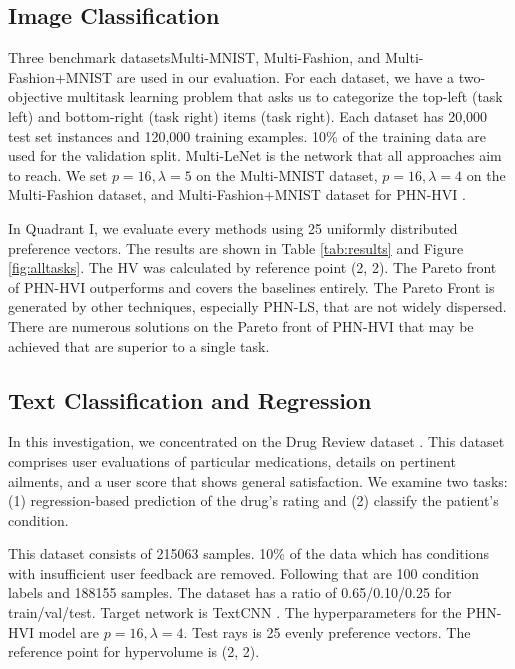 \documentclass[letterpaper]{article} %
\newcommand{\ourmodel}{PHN-HVI }
\begin{document}
\subsection{Image Classification}
Three benchmark datasetsMulti-MNIST, Multi-Fashion, and Multi-Fashion+MNIST \cite{lin2019pareto} are used in our evaluation. For each dataset, we have a two-objective multitask learning problem that asks us to categorize the top-left (task left) and bottom-right (task right) items (task right). Each dataset has 20,000 test set instances and 120,000 training examples. 10\% of the training data are used for the validation split. Multi-LeNet \cite{sener2019multitask} is the network that all approaches aim to reach. We set $p=16, \lambda=5$ on the Multi-MNIST dataset, $p=16, \lambda=4$ on the Multi-Fashion dataset, and Multi-Fashion+MNIST dataset for \ourmodel. 


In Quadrant I, we evaluate every methods using 25 uniformly distributed preference vectors. The results are shown in Table \ref{tab:results} and Figure \ref{fig:alltasks}. The HV was calculated by reference point (2, 2). The Pareto front of \ourmodel outperforms and covers the baselines entirely. The Pareto Front is generated by other techniques, especially PHN-LS, that are not widely dispersed. There are numerous solutions on the Pareto front of \ourmodel that may be achieved that are superior to a single task. 

\subsection{Text Classification and Regression}


In this investigation, we concentrated on the Drug Review dataset \cite{Felix2018}. This dataset comprises user evaluations of particular medications, details on pertinent ailments, and a user score that shows general satisfaction. We examine two tasks: (1) regression-based prediction of the drug's rating and (2) classify the patient's condition. 

This dataset consists of 215063 samples. 10\% of the data which has conditions with insufficient user feedback are removed.
Following that are 100 condition labels and 188155 samples. The dataset has a ratio of 0.65/0.10/0.25 for train/val/test. Target network is TextCNN \cite{TextCNN}. The hyperparameters for the \ourmodel model are $p=16, \lambda=4$. Test rays is 25 evenly preference vectors. The reference point for hypervolume is (2, 2). 
\end{document}
